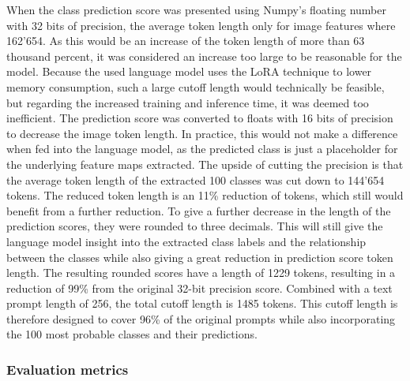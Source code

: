         When the class prediction score was presented using Numpy's floating number with 32 bits of precision, the average token length only for image features where 162'654. As this would be an increase of the token length of more than 63 thousand percent, it was considered an increase too large to be reasonable for the model. Because the used language model uses the LoRA technique to lower memory consumption, such a large cutoff length would technically be feasible, but regarding the increased training and inference time, it was deemed too inefficient.  
        The prediction score was converted to floats with 16 bits of precision to decrease the image token length. In practice, this would not make a difference when fed into the language model, as the predicted class is just a placeholder for the underlying feature maps extracted. The upside of cutting the precision is that the average token length of the extracted 100 classes was cut down to 144'654 tokens. The reduced token length is an 11\% reduction of tokens, which still would benefit from a further reduction. To give a further decrease in the length of the prediction scores, they were rounded to three decimals. This will still give the language model insight into the extracted class labels and the relationship between the classes while also giving a great reduction in prediction score token length. The resulting rounded scores have a length of 1229 tokens, resulting in a reduction of 99\% from the original 32-bit precision score. Combined with a text prompt length of 256, the total cutoff length is 1485 tokens. This cutoff length is therefore designed to cover 96\% of the original prompts while also incorporating the 100 most probable classes and their predictions. 


         


        \subsubsection{Evaluation metrics}

       
        

        


